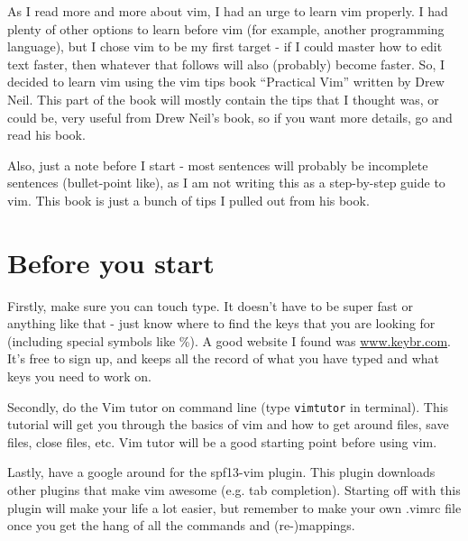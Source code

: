 As I read more and more about vim, I had an urge to learn vim properly.
I had plenty of other options to learn before vim (for example, another programming language), but I chose vim to be my first target - if I could master how to edit text faster, then whatever that follows will also (probably) become faster.
So, I decided to learn vim using the vim tips book ``Practical Vim'' written by Drew Neil.
This part of the book will mostly contain the tips that I thought was, or could be, very useful from Drew Neil's book, so if you want more details, go and read his book.

Also, just a note before I start - most sentences will probably be incomplete sentences (bullet-point like), as I am not writing this as a step-by-step guide to vim.
This book is just a bunch of tips I pulled out from his book.

\section{Before you start}

Firstly, make sure you can touch type.
It doesn't have to be super fast or anything like that - just know where to find the keys that you are looking for (including special symbols like \%).
A good website I found was \url{www.keybr.com}.
It's free to sign up, and keeps all the record of what you have typed and what keys you need to work on.

Secondly, do the Vim tutor on command line (type \verb|vimtutor| in terminal).
This tutorial will get you through the basics of vim and how to get around files, save files, close files, etc.
Vim tutor will be a good starting point before using vim.

Lastly, have a google around for the spf13-vim plugin.
This plugin downloads other plugins that make vim awesome (e.g. tab completion).
Starting off with this plugin will make your life a lot easier, but remember to make your own .vimrc file once you get the hang of all the commands and (re-)mappings.
